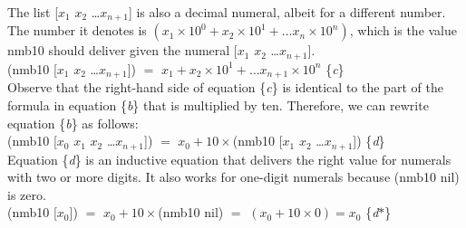 The list \textsf{[$x_1$ $x_2$ \dots $x_{n+1}$]} is also a decimal numeral,
albeit for a different number.
The number it denotes is
$(x_1 \times 10^0 + x_2 \times 10^1 + \dots x_n \times 10^n)$,
which is the value \textsf{nmb10} should deliver given the numeral \textsf{[$x_1$ $x_2$ \dots $x_{n+1}$]}.\\
\hspace*{1cm}
\textsf{(nmb10 [$x_1$ $x_2$ \dots $x_{n+1}$])} $=$ $x_1 + x_2 \times 10^1 + \dots x_{n+1} \times 10^n$ \hfill \{\emph{c}\}\\

Observe that the right-hand side of equation \{\emph{c}\}
is identical
to the part of the formula in equation \{\emph{b}\} that is multiplied by ten.
Therefore, we can rewrite equation \{\emph{b}\} as follows:\\
\hspace*{1cm}
\textsf{(nmb10 [$x_0$ $x_1$ $x_2$ \dots $x_{n+1}$])} $=$
$x_0 + 10 \times$\textsf{(nmb10 [$x_1$ $x_2$ \dots $x_{n+1}$])} \hfill \{\emph{d}\}\\
Equation \{\emph{d}\} is an inductive equation that delivers the right value for
numerals with two or more digits. It also works
for one-digit numerals because (nmb10 nil) is zero.\\
\hspace*{1cm}
\textsf{(nmb10 [$x_0$])} $=$ $x_0 + 10 \times$\textsf{(nmb10 nil)} $=$ $(x_0 + 10 \times 0) = x_0$ \hfill \{\emph{d}$*$\}\\

